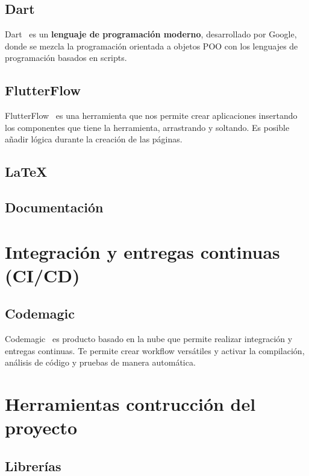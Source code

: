 \subsection{Dart}
Dart~\cite{dart} es un \textbf{lenguaje de programación moderno}, desarrollado por Google, donde se mezcla la programación orientada a objetos POO con los lenguajes de programación basados en scripts.
\subsection{FlutterFlow}
FlutterFlow~\cite{flutterflow} es una herramienta que nos permite crear aplicaciones insertando los componentes que tiene la herramienta, arrastrando y soltando. Es posible añadir lógica durante la creación de las páginas.
\subsection{LaTeX}
\subsection{Documentación}
\section{Integración y entregas continuas (CI/CD)}
\subsection{Codemagic}
Codemagic~\cite{codemagic} es producto basado en la nube que permite realizar integración y entregas continuas. Te permite crear workflow versátiles y activar la compilación,  análisis de código y pruebas de manera automática.
\section{Herramientas contrucción del proyecto}
\subsection{Librerías}



